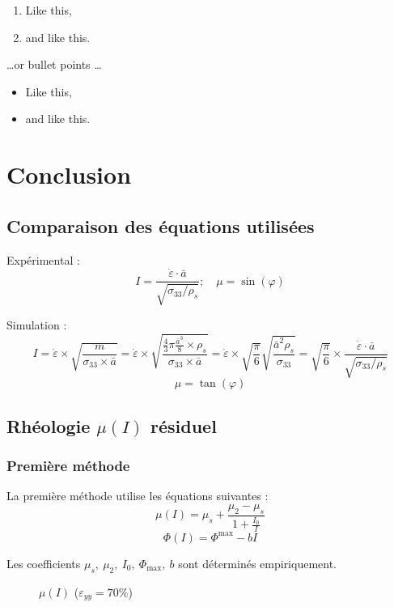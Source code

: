 \documentclass[a4paper,12pt]{report}
\begin{document}
\begin{enumerate}
\item Like this,
\item and like this.
\end{enumerate}
\dots or bullet points \dots
\begin{itemize}
\item Like this,
\item and like this.
\end{itemize}
\chapter{Conclusion}

\section{Comparaison des équations utilisées}

Expérimental : 
\[
I =  \frac{\dot{\varepsilon} \cdot \bar{a}}{\sqrt{\sigma_{33}/\rho_s}}; \quad \mu = \sin(\varphi)
\]

Simulation : 
\[
I = \dot{\varepsilon} \times \sqrt {\frac{m}{\sigma_{33}\times \bar{a}}}  
= \dot{\varepsilon} \times \sqrt {\frac{\frac{4}{3} \pi \frac{\bar{a}^3}{8} \times \rho_s}{\sigma_{33}\times \bar{a}}} 
= \dot{\varepsilon} \times \sqrt{\frac{\pi}{6}} \sqrt {\frac{\bar{a}^2 \rho_s}{\sigma_{33}}} 
= \boxed{\sqrt{\frac{\pi}{6}}} \times \frac{\dot{\varepsilon} \cdot \bar{a}}{\sqrt{\sigma_{33}/\rho_s}}
\]
\[
\mu = \tan(\varphi)
\]

\section{Rhéologie $\mu(I)$ résiduel}

\subsection{Première méthode}

La première méthode utilise les équations suivantes :
\[
\mu(I) = \mu_s + \frac{\mu_2 - \mu_s}{1 + \frac{I_0}{I}}
\]
\[
\Phi(I) = \Phi^{\max} - bI
\]

Les coefficients $\mu_s,\ \mu_2,\ I_0,\ \Phi_{\max},\ b$ sont déterminés empiriquement.

\begin{figure}
    \centering
    {\small
        
    }
    \caption{$\mu(I)$ ($\varepsilon_{yy} = 70\%$)}
\end{figure}
\end{document}
